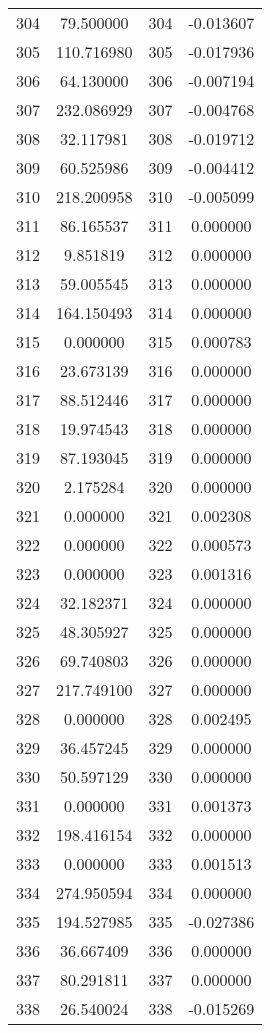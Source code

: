 \documentclass[12pt]{article}
\begin{document}
\begin{longtable}{@{}cccc@{}}
304 & 79.500000 & 304 & -0.013607 \\
305 & 110.716980 & 305 & -0.017936 \\
306 & 64.130000 & 306 & -0.007194 \\
307 & 232.086929 & 307 & -0.004768 \\
308 & 32.117981 & 308 & -0.019712 \\
309 & 60.525986 & 309 & -0.004412 \\
310 & 218.200958 & 310 & -0.005099 \\
311 & 86.165537 & 311 & 0.000000 \\
312 & 9.851819 & 312 & 0.000000 \\
313 & 59.005545 & 313 & 0.000000 \\
314 & 164.150493 & 314 & 0.000000 \\
315 & 0.000000 & 315 & 0.000783 \\
316 & 23.673139 & 316 & 0.000000 \\
317 & 88.512446 & 317 & 0.000000 \\
318 & 19.974543 & 318 & 0.000000 \\
319 & 87.193045 & 319 & 0.000000 \\
320 & 2.175284 & 320 & 0.000000 \\
321 & 0.000000 & 321 & 0.002308 \\
322 & 0.000000 & 322 & 0.000573 \\
323 & 0.000000 & 323 & 0.001316 \\
324 & 32.182371 & 324 & 0.000000 \\
325 & 48.305927 & 325 & 0.000000 \\
326 & 69.740803 & 326 & 0.000000 \\
327 & 217.749100 & 327 & 0.000000 \\
328 & 0.000000 & 328 & 0.002495 \\
329 & 36.457245 & 329 & 0.000000 \\
330 & 50.597129 & 330 & 0.000000 \\
331 & 0.000000 & 331 & 0.001373 \\
332 & 198.416154 & 332 & 0.000000 \\
333 & 0.000000 & 333 & 0.001513 \\
334 & 274.950594 & 334 & 0.000000 \\
335 & 194.527985 & 335 & -0.027386 \\
336 & 36.667409 & 336 & 0.000000 \\
337 & 80.291811 & 337 & 0.000000 \\
338 & 26.540024 & 338 & -0.015269 \\

\end{longtable}
\end{document}
